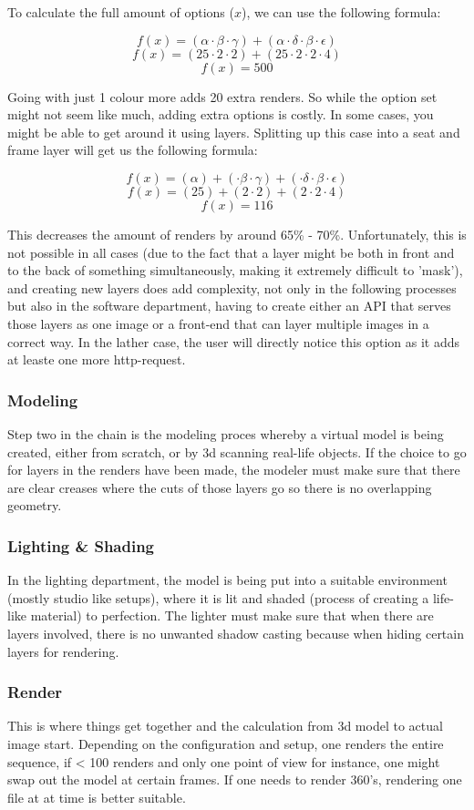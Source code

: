 To calculate the full amount of options ($x$), we can use the following formula:
 
\[ f(x) = (\alpha \cdot \beta \cdot \gamma) + (\alpha \cdot \delta \cdot \beta \cdot \epsilon)\]
\[ f(x) = (25 \cdot 2 \cdot 2) + (25 \cdot 2 \cdot 2 \cdot 4)\]
\[ f(x) = 500\]

Going with just 1 colour more adds 20 extra renders. So while the option set might not seem like much, adding extra options is costly. In some cases, you might be able to get around it using layers.
Splitting up this case into a seat and frame layer will get us the following formula:

\[ f(x) = (\alpha) + (\cdot \beta \cdot \gamma) + (\cdot \delta \cdot \beta \cdot \epsilon)\]
\[ f(x) = (25) + (2 \cdot 2) + (2 \cdot 2 \cdot 4)\]
\[ f(x) = 116\]

This decreases the amount of renders by around 65\% - 70\%. Unfortunately, this is not possible in all cases (due to the fact that a layer might be both in front and to the back of something simultaneously, making it extremely difficult to 'mask'), and creating new layers does add complexity, not only in the following processes but also in the software department, having to create either an API that serves those layers as one image or a front-end that can layer multiple images in a correct way. In the lather case, the user will directly notice this option as it adds at leaste one more http-request.

\subsubsection{Modeling}
Step two in the chain is the modeling proces whereby a virtual model is being created, either from scratch, or by 3d scanning real-life objects. If the choice to go for layers in the renders have been made, the modeler must make sure that there are clear creases where the cuts of those layers go so there is no overlapping geometry.
\subsubsection{Lighting \& Shading}
In the lighting department, the model is being put into a suitable environment (mostly studio like setups), where it is lit and shaded (process of creating a life-like material) to perfection. The lighter must make sure that when there are layers involved, there is no unwanted shadow casting because when hiding certain layers for rendering.
\subsubsection{Render}
This is where things get together and the calculation from 3d model to actual image start. Depending on the configuration and setup, one renders the entire sequence, if < 100 renders and only one point of view for instance, one might swap out the model at certain frames. If one needs to render 360's, rendering one file at at time is better suitable.
